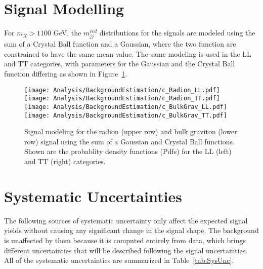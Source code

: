 \section{Signal Modelling}
\label{sec:SignalModel}

For $m_{X} > 1100$ GeV, the $m_{jj}^{red}$ distributions for the signals are modeled using the sum of a Crystal Ball function and a Gaussian, where the two function are constrained to have the same mean value. The same modeling is used in the LL and TT categories, with parameters for the Gaussian and the Crystal Ball function differing as shown in Figure~\ref{fig:sigfit}. 

\begin{figure}[h!]
\centering
\texttt{[image: Analysis/BackgroundEstimation/c\_Radion\_LL.pdf]}
\texttt{[image: Analysis/BackgroundEstimation/c\_Radion\_TT.pdf]}
\texttt{[image: Analysis/BackgroundEstimation/c\_BulkGrav\_LL.pdf]}
\texttt{[image: Analysis/BackgroundEstimation/c\_BulkGrav\_TT.pdf]}
\caption{Signal modeling for the radion (upper row) and bulk graviton (lower row) signal using the sum of a Gaussian and Crystal Ball functions. Shown are the probablity density functions (Pdfs) for the LL (left) and TT (right) categories.}
\label{fig:sigfit}
\end{figure}

\section{Systematic Uncertainties}
\label{sec:SysUnc}

The following sources of systematic uncertainty only affect the expected signal yields without causing any significant change in the signal shape. The background is unaffected by them because it is computed entirely from data, which brings different uncertainties that will be described following the signal uncertainties. All of the systematic uncertainties are summarized in Table~\ref{tab:SysUnc}.

